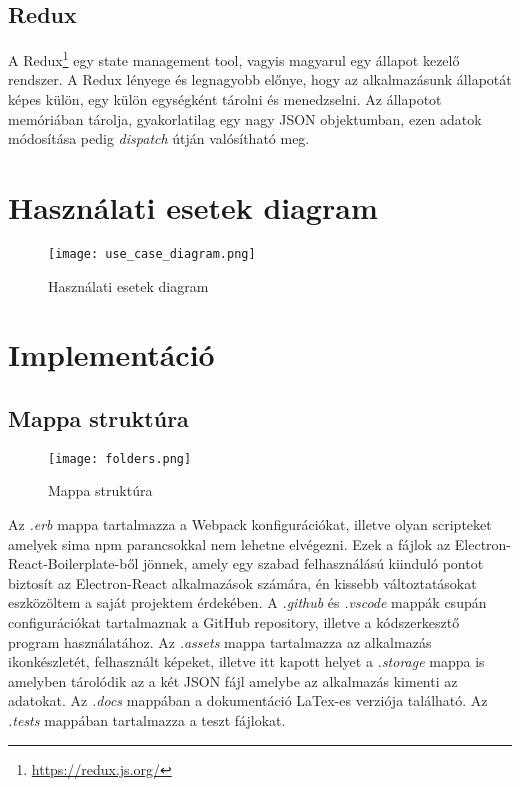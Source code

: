 \subsection{Redux}
A Redux\footnote{\url{https://redux.js.org/}} egy state management tool, vagyis magyarul egy állapot kezelő rendszer. A Redux lényege és legnagyobb előnye, hogy az alkalmazásunk állapotát képes külön, egy külön egységként tárolni és menedzselni. Az állapotot memóriában tárolja, gyakorlatilag egy nagy JSON objektumban, ezen adatok módosítása pedig {\it dispatch} útján valósítható meg.

\cleardoublepage
\section{Használati esetek diagram}
\begin{figure}[H]
	\centering
	\texttt{[image: use\_case\_diagram.png]}
	\caption{Használati esetek diagram}
	\label{fig:use_case_diagram}
\end{figure}

\section{Implementáció}

\subsection{Mappa struktúra}
\begin{figure}[H]
	\centering
	\texttt{[image: folders.png]}
	\caption{Mappa struktúra}
	\label{fig:folders}
\end{figure}
Az {\it .erb} mappa tartalmazza a Webpack konfigurációkat, illetve olyan scripteket amelyek sima npm parancsokkal nem lehetne elvégezni. Ezek a fájlok az Electron-React-Boilerplate-ből jönnek, amely egy szabad felhasználású kiinduló pontot biztosít az Electron-React alkalmazások számára, én kissebb változtatásokat eszközöltem a saját projektem érdekében.
A {\it .github} és {\it .vscode} mappák csupán configurációkat tartalmaznak a GitHub repository, illetve a kódszerkesztő program használatához.
Az {\it .assets} mappa tartalmazza az alkalmazás ikonkészletét, felhasznált képeket, illetve itt kapott helyet a {\it .storage} mappa is amelyben tárolódik az a két JSON fájl amelybe az alkalmazás kimenti az adatokat.
Az {\it .docs} mappában a dokumentáció LaTex-es verziója található.
Az {\it .tests} mappában tartalmazza a teszt fájlokat.

